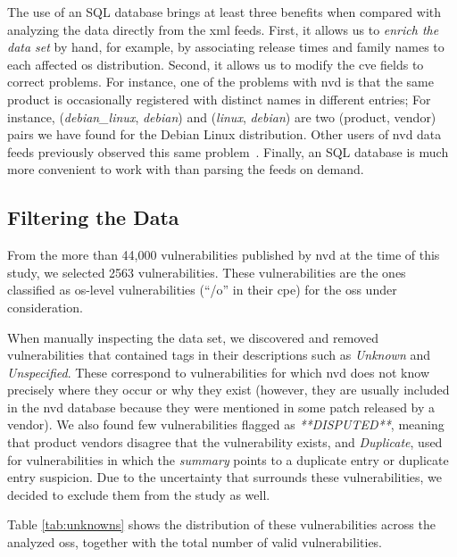 The use of an SQL database brings at least three benefits when compared with analyzing the data directly from the \gls{xml} feeds.
First, it allows us to \emph{enrich the data set} by hand, for example, by associating release times and family names to each affected \gls{os} distribution.
Second, it allows us to modify the \gls{cve} fields to correct problems.
For instance, one of the problems with \gls{nvd} is that the same product is occasionally registered with distinct names in different entries;
For instance, (\textit{debian\_linux}, \textit{debian}) and (\textit{linux}, \textit{debian}) are two (product, vendor) pairs we have found for the Debian Linux distribution.
Other users of \gls{nvd} data feeds previously observed this same problem~\cite{cvedetails}.
Finally, an SQL database is much more convenient to work with than parsing the feeds on demand.

\subsection{Filtering the Data}\label{filtering_data}


From the more than 44,000 vulnerabilities published by \gls{nvd} at the time of this study, we selected 2563 vulnerabilities.
These vulnerabilities are the ones classified as \gls{os}-level vulnerabilities (``/o'' in their \gls{cpe}) for the \glspl{os} under consideration.

When manually inspecting the data set, we discovered and removed vulnerabilities that contained tags in their descriptions such as \emph{Unknown} and \emph{Unspecified}. 
These correspond to vulnerabilities for which \gls{nvd} does not know precisely where they occur or why they exist (however, they are usually included in the \gls{nvd} database because they were mentioned in some patch released by a vendor). 
We also found few vulnerabilities flagged as \emph{**DISPUTED**}, meaning that product vendors disagree that the vulnerability exists, and \emph{Duplicate}, used for vulnerabilities in which the \emph{summary} points to a duplicate entry or duplicate entry suspicion.
Due to the uncertainty that surrounds these vulnerabilities, we decided to exclude them from the study as well.

Table \ref{tab:unknowns} shows the distribution of these vulnerabilities across the analyzed \glspl{os}, together with the total number of valid vulnerabilities.


